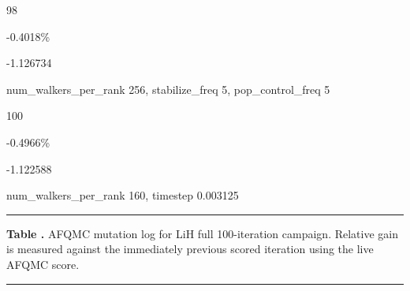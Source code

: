 \noindent\parbox[t]{0.05\linewidth}{\centering\strut 98}\hspace{0.006\linewidth}\parbox[t]{0.04\linewidth}{\centering\strut {}}\hspace{0.006\linewidth}\parbox[t]{0.10\linewidth}{\centering\strut -0.4018\%}\hspace{0.006\linewidth}\parbox[t]{0.115\linewidth}{\centering\strut -1.126734}\hspace{0.006\linewidth}\parbox[t]{0.671\linewidth}{num\_walkers\_per\_rank 256, stabilize\_freq 5, pop\_control\_freq 5}\par\smallskip
{}\par\smallskip
\noindent\parbox[t]{0.05\linewidth}{\centering\strut 100}\hspace{0.006\linewidth}\parbox[t]{0.04\linewidth}{\centering\strut {}}\hspace{0.006\linewidth}\parbox[t]{0.10\linewidth}{\centering\strut -0.4966\%}\hspace{0.006\linewidth}\parbox[t]{0.115\linewidth}{\centering\strut -1.122588}\hspace{0.006\linewidth}\parbox[t]{0.671\linewidth}{num\_walkers\_per\_rank 160, timestep 0.003125}\par\smallskip
\noindent\rule{\linewidth}{0.5pt}
\par\medskip
{}
\label{tab:supp_afqmc_lih}
\noindent\textbf{Table \thetable.} AFQMC mutation log for LiH full 100-iteration campaign. Relative gain is measured against the immediately previous scored iteration using the live AFQMC score.
\par\medskip
\noindent\rule{\linewidth}{0.5pt}
\par\smallskip
